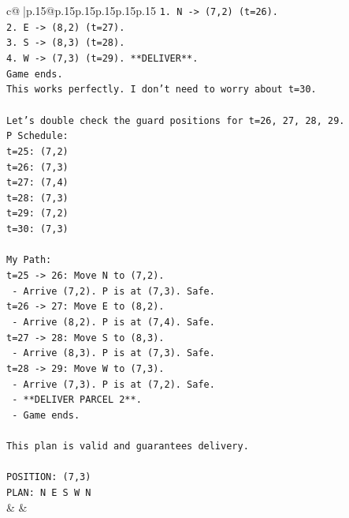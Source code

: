 \documentclass{article}
\begin{document}
{\begin{supertabular}{c@{$\;$}|p{.15\linewidth}@{}p{.15\linewidth}p{.15\linewidth}p{.15\linewidth}p{.15\linewidth}p{.15\linewidth}}
{{{\texttt{1. N {-}> (7,2) (t=26).} \\
\texttt{2. E {-}> (8,2) (t=27).} \\
\texttt{3. S {-}> (8,3) (t=28).} \\
\texttt{4. W {-}> (7,3) (t=29). **DELIVER**.} \\
\texttt{Game ends.} \\
\texttt{This works perfectly. I don't need to worry about t=30.} \\
\\ 
\texttt{Let's double check the guard positions for t=26, 27, 28, 29.} \\
\texttt{P Schedule:} \\
\texttt{t=25: (7,2)} \\
\texttt{t=26: (7,3)} \\
\texttt{t=27: (7,4)} \\
\texttt{t=28: (7,3)} \\
\texttt{t=29: (7,2)} \\
\texttt{t=30: (7,3)} \\
\\ 
\texttt{My Path:} \\
\texttt{t=25 {-}> 26: Move N to (7,2).} \\
\texttt{   {-} Arrive (7,2). P is at (7,3). Safe.} \\
\texttt{t=26 {-}> 27: Move E to (8,2).} \\
\texttt{   {-} Arrive (8,2). P is at (7,4). Safe.} \\
\texttt{t=27 {-}> 28: Move S to (8,3).} \\
\texttt{   {-} Arrive (8,3). P is at (7,3). Safe.} \\
\texttt{t=28 {-}> 29: Move W to (7,3).} \\
\texttt{   {-} Arrive (7,3). P is at (7,2). Safe.} \\
\texttt{   {-} **DELIVER PARCEL 2**.} \\
\texttt{   {-} Game ends.} \\
\\ 
\texttt{This plan is valid and guarantees delivery.} \\
\\ 
\texttt{POSITION: (7,3)} \\
\texttt{PLAN: N E S W N} \\
            }
        }
    }
    & & \\ \\


\end{supertabular}}
\end{document}
